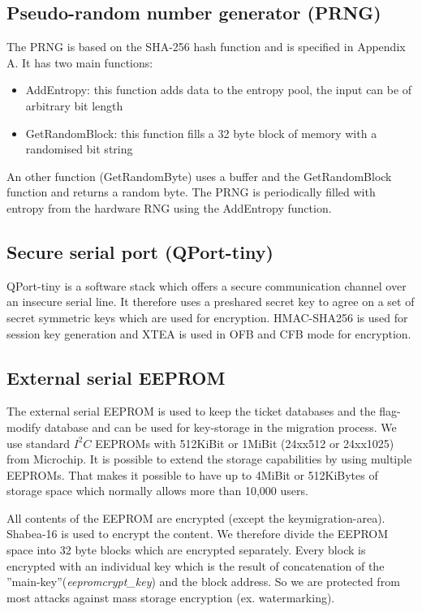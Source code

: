 
\subsection{Pseudo-random number generator (PRNG)}
The PRNG is based on the SHA-256 hash function and is specified in Appendix A.
It has two main functions:
\begin{itemize}
 \item AddEntropy: this function adds data to the entropy pool, the input can be of arbitrary bit length
 \item GetRandomBlock: this function fills a 32 byte block of memory with a randomised bit string
\end{itemize}
An other function (GetRandomByte) uses a buffer and the GetRandomBlock function and returns a random byte.
The PRNG is periodically filled with entropy from the hardware RNG using the AddEntropy function.


\subsection{Secure serial port (QPort-tiny)}
QPort-tiny\cite{QPort-tiny} is a software stack which offers a secure communication channel over an insecure serial line. It therefore uses a preshared secret key to agree on a set of secret symmetric keys which are used for encryption. HMAC-SHA256 is used for session key generation and XTEA\cite{XTEA} is used in OFB and CFB mode for encryption. 

\subsection{External serial EEPROM}
The external serial EEPROM is used to keep the ticket databases and the flag-modify database and can be used for key-storage in the migration process. We use standard $I^2C$\cite{I2C} EEPROMs with 512KiBit or 1MiBit (24xx512\cite{24xx512} or 24xx1025\cite{24xx1025}) from Microchip\cite{microchip}. It is possible to extend the storage capabilities by using multiple EEPROMs. That makes it possible to have up to 4MiBit or 512KiBytes of storage space which normally allows more than 10,000 users.

All contents of the EEPROM are encrypted (except the keymigration-area). Shabea-16 is used to encrypt the content. We therefore divide the EEPROM space into 32 byte blocks which are encrypted separately. Every block is encrypted with an individual key which is the result of concatenation of the ''main-key''(\textit{eepromcrypt\_key}) and the block address. So we are protected from most attacks against mass storage encryption (ex. watermarking).

